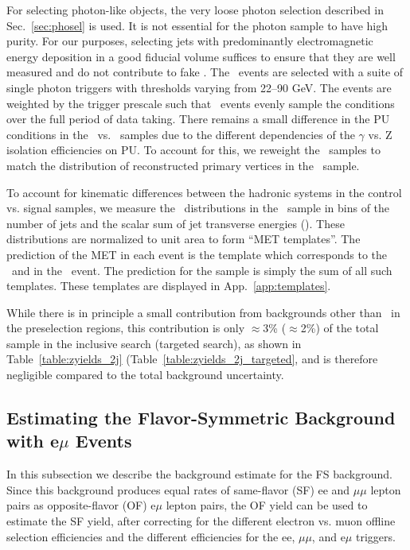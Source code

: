 For selecting photon-like objects, the very loose photon selection described in Sec.~\ref{sec:phosel} is used.
It is not essential for the photon sample to have high purity. For our purposes, selecting jets with predominantly 
electromagnetic energy deposition in a good fiducial volume suffices to ensure that 
they are well measured and do not contribute to fake \MET. The \gjets\ events are selected with a suite of
single photon triggers with \pt thresholds varying from 22--90 GeV. The events are weighted by the trigger prescale
such that \gjets\ events evenly sample the conditions over the full period of data taking.
There remains a small difference in the PU conditions in the \gjets\ vs. \zjets\ samples due to the different
dependencies of the $\gamma$ vs. Z isolation efficiencies on PU. To account for this, we reweight the \gjets\ samples
to match the distribution of reconstructed primary vertices in the \zjets\ sample.

To account for kinematic differences between the hadronic systems in the control vs. signal 
samples, we measure the \MET\ distributions in the \gjets\ sample in bins of the number of jets 
and the scalar sum of jet transverse energies (\Ht). These \MET distributions are normalized to unit area to form ``MET templates''.
The prediction of the MET in each \Z event is the template which corresponds to the \njets\ and 
\Ht in the \zjets\ event. The prediction for the \Z sample is simply the sum of all such templates.
These templates are displayed in App.~\ref{app:templates}.

While there is in principle a small contribution from backgrounds other than \zjets\ in the preselection regions,
this contribution is only $\approx$3\% ($\approx$2\%) of the total sample in the inclusive search (targeted search),
as shown in Table~\ref{table:zyields_2j} (Table~\ref{table:zyields_2j_targeted}, and is therefore negligible compared to the total 
background uncertainty.

\subsection{Estimating the Flavor-Symmetric Background with e$\mu$ Events}
\label{sec:bkg_fs}

In this subsection we describe the background estimate for the FS background. Since this background produces equal rates of same-flavor (SF)
ee and $\mu\mu$ lepton pairs as opposite-flavor (OF) e$\mu$ lepton pairs, the OF yield can be used to estimate the SF yield, after
correcting for the different electron vs. muon offline selection efficiencies and the different efficiencies for the ee, $\mu\mu$, and e$\mu$ triggers.

